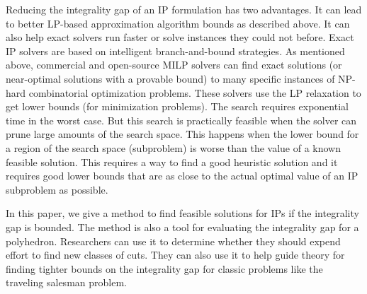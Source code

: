 Reducing the integrality gap of an IP formulation has two advantages.  It can lead to better LP-based approximation algorithm bounds as described above.  It can also help exact solvers run faster or solve instances they could not before. Exact IP solvers are based on intelligent branch-and-bound strategies.  As mentioned above, commercial and open-source MILP solvers can find exact solutions (or near-optimal solutions with a provable bound) to many specific instances of NP-hard combinatorial optimization problems. These solvers use the LP relaxation to get lower bounds (for minimization problems).  The search requires exponential time in the worst case. But this search is practically feasible when the solver can prune large amounts of the search space.  This happens when the lower bound for a region of the search space (subproblem) is worse than the value of a known feasible solution.  This requires a way to find a good heuristic solution and it requires good lower bounds that are as close to the actual optimal value of an IP subproblem as possible.

In this paper, we give a method to find feasible solutions for IPs if the integrality gap is bounded. The method is also a tool for evaluating the integrality gap for a polyhedron.  Researchers can use it to determine whether they should expend effort to find new classes of cuts.  They can also use it to help guide theory for finding tighter bounds on the integrality gap for classic problems like the traveling salesman problem.



